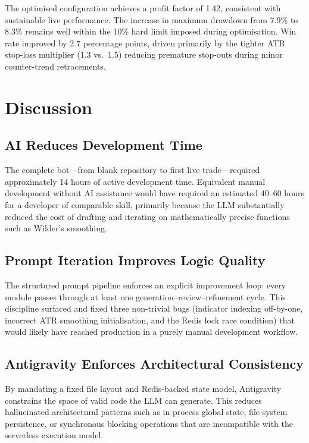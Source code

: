 \documentclass[conference]{IEEEtran}
\begin{document}
The optimised configuration achieves a profit factor of 1.42,
consistent with sustainable live performance.  The increase in
maximum drawdown from 7.9\% to 8.3\% remains well within the 10\%
hard limit imposed during optimisation.  Win rate improved by
2.7 percentage points, driven primarily by the tighter ATR
stop-loss multiplier (1.3 vs.\ 1.5) reducing premature stop-outs
during minor counter-trend retracements.

\section{Discussion}

\subsection{AI Reduces Development Time}

The complete bot---from blank repository to first live
trade---required approximately 14 hours of active development time.
Equivalent manual development without AI assistance would have
required an estimated 40--60 hours for a developer of comparable
skill, primarily because the LLM substantially reduced the cost of
drafting and iterating on mathematically precise functions such as
Wilder's smoothing.

\subsection{Prompt Iteration Improves Logic Quality}

The structured prompt pipeline enforces an explicit improvement
loop: every module passes through at least one
generation--review--refinement cycle.  This discipline surfaced and
fixed three non-trivial bugs (indicator indexing off-by-one,
incorrect ATR smoothing initialisation, and the Redis lock race
condition) that would likely have reached production in a purely
manual development workflow.

\subsection{Antigravity Enforces Architectural Consistency}

By mandating a fixed file layout and Redis-backed state model,
Antigravity constrains the space of valid code the LLM can
generate.  This reduces hallucinated architectural patterns such as
in-process global state, file-system persistence, or synchronous
blocking operations that are incompatible with the serverless
execution model.
\end{document}
